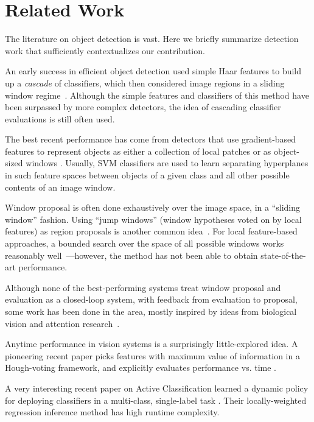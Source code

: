 \section{Related Work}
The literature on object detection is vast.
Here we briefly summarize detection work that sufficiently contextualizes our contribution.

An early success in efficient object detection used simple Haar features to build up a \emph{cascade} of classifiers, which then considered image regions in a sliding window regime~\cite{Viola2001}.
Although the simple features and classifiers of this method have been surpassed by more complex detectors, the idea of cascading classifier evaluations is still often used.

The best recent performance has come from detectors that use gradient-based features to represent objects as either a collection of local patches or as object-sized windows \cite{Dalal2005,Lowe2004}.
Usually, SVM classifiers are used to learn separating hyperplanes in such feature spaces between objects of a given class and all other possible contents of an image window.

Window proposal is often done exhaustively over the image space, in a ``sliding window'' fashion.
Using ``jump windows'' (window hypotheses voted on by local features) as region proposals is another common idea~\cite{Chum2007b,Vedaldi2009,Vijayanarasimhan2011}.
For local feature-based approaches, a bounded search over the space of all possible windows works reasonably well~\cite{Lampert2008b}---however, the method has not been able to obtain state-of-the-art performance.

Although none of the best-performing systems treat window proposal and evaluation as a closed-loop system, with feedback from evaluation to proposal, some work has been done in the area, mostly inspired by ideas from biological vision and attention research~\cite{Butko2009,Vogel2008,Paletta2005}.

Anytime performance in vision systems is a surprisingly little-explored idea.
A pioneering recent paper picks features with maximum value of information in a Hough-voting framework, and explicitly evaluates performance vs. time \cite{Vijayanarasimhan2010}.


A very interesting recent paper on Active Classification learned a dynamic policy for deploying classifiers in a multi-class, single-label task \cite{Gao2011}.
Their locally-weighted regression inference method has high runtime complexity.


